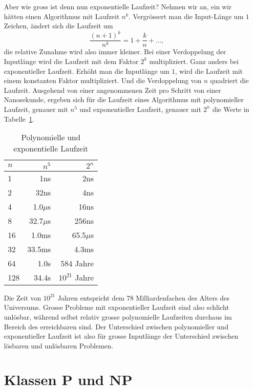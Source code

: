 Aber wie gross ist denn nun exponentielle Laufzeit?
Nehmen wir an,
ein wir hätten einen Algorithmus mit Laufzeit $n^k$. Vergrössert
man die Input-Länge um $1$ Zeichen, ändert sich die Laufzeit um
\[
\frac{(n+1)^k}{n^k}
=
1+\frac{k}{n} +\dots,
\]
die relative Zunahme wird also immer kleiner. Bei einer Verdoppelung
der Inputlänge wird die Laufzeit mit dem Faktor $2^k$ multipliziert.
Ganz anders bei exponentieller Laufzeit.
Erhöht man die Inputlänge um $1$, wird die Laufzeit mit einem
konstanten Faktor multipliziert. Und die Verdoppelung von $n$
quadriert die Laufzeit.
Ausgehend von einer angenommenen
Zeit pro Schritt von einer Nanosekunde, ergeben sich
für die Laufzeit eines Algorithmus
mit polynomieller Laufzeit, genauer mit $n^5$ und exponentieller Laufzeit,
genauer mit $2^n$ die Werte in Tabelle~\ref{laufzeittabelle}.
\begin{table}
\begin{center}
\begin{tabular}{|l|rr|}
\hline
$n$&$n^5$&$2^n$\\
\hline
  1&             1ns&             2ns\\
  2&            32ns&             4ns\\
  4&       1.0$\mu$s&            16ns\\
  8&      32.7$\mu$s&           256ns\\
 16&           1.0ms&      65.5$\mu$s\\
 32&          33.5ms&           4.3ms\\
 64&            1.0s&       584 Jahre\\
128&           34.4s& $10^{21}$ Jahre\\
\hline
\end{tabular}
\end{center}
\caption{Polynomielle und exponentielle Laufzeit\label{laufzeittabelle}}
\end{table}
Die Zeit von $10^{21}$ Jahren entspricht dem 78 Milliardenfachen des
Alters des Universums. Grosse Probleme mit exponentieller Laufzeit
sind also schlicht unlösbar, während selbst relativ grosse
polynomielle Laufzeiten durchaus im Bereich des erreichbaren sind.
Der Unterschied zwischen polynomieller und exponentieller Laufzeit
ist also für grosse Inputlänge der Unterschied zwischen lösbaren und
unlösbaren Problemen.

\section{Klassen P und NP}
